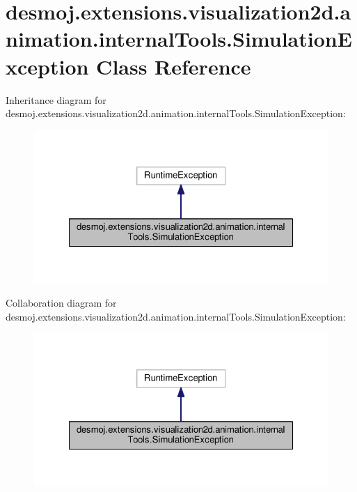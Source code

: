 \section{desmoj.\-extensions.\-visualization2d.\-animation.\-internal\-Tools.\-Simulation\-Exception Class Reference}
\label{classdesmoj_1_1extensions_1_1visualization2d_1_1animation_1_1internal_tools_1_1_simulation_exception}


Inheritance diagram for desmoj.\-extensions.\-visualization2d.\-animation.\-internal\-Tools.\-Simulation\-Exception\-:
\nopagebreak
\begin{figure}[H]
\begin{center}
\leavevmode
\includegraphics[width=324pt]{classdesmoj_1_1extensions_1_1visualization2d_1_1animation_1_1internal_tools_1_1_simulation_exception__inherit__graph}
\end{center}
\end{figure}


Collaboration diagram for desmoj.\-extensions.\-visualization2d.\-animation.\-internal\-Tools.\-Simulation\-Exception\-:
\nopagebreak
\begin{figure}[H]
\begin{center}
\leavevmode
\includegraphics[width=324pt]{classdesmoj_1_1extensions_1_1visualization2d_1_1animation_1_1internal_tools_1_1_simulation_exception__coll__graph}
\end{center}
\end{figure}

